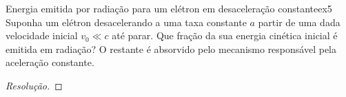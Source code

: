 \begin{exercício}{Energia emitida por radiação para um elétron em desaceleração constante}{ex5}
    Suponha um elétron desacelerando a uma taxa constante \(a\) partir de uma dada velocidade inicial \(v_0 \ll c\) até parar. Que fração da sua energia cinética inicial é emitida em radiação? O restante é absorvido pelo mecanismo responsável pela aceleração constante.
\end{exercício}
\begin{proof}[Resolução]
    
\end{proof}
